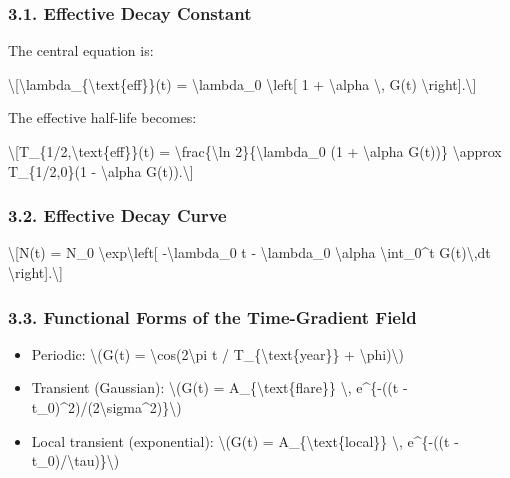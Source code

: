 \documentclass[
  10pt,
]{article}
\providecommand{\tightlist}{%
  \setlength{\itemsep}{0pt}\setlength{\parskip}{0pt}}
\begin{document}
\hypertarget{effective-decay-constant}{%
\subsubsection{3.1. Effective Decay
Constant}\label{effective-decay-constant}}

The central equation is:

\textbackslash{[}\textbackslash lambda\_\{\textbackslash text\{eff\}\}(t)
= \textbackslash lambda\_0 \textbackslash left{[} 1 +
\textbackslash alpha \textbackslash, G(t)
\textbackslash right{]}.\textbackslash{]}

The effective half-life becomes:

\textbackslash{[}T\_\{1/2,\textbackslash text\{eff\}\}(t) =
\textbackslash frac\{\textbackslash ln 2\}\{\textbackslash lambda\_0 (1
+ \textbackslash alpha G(t))\} \textbackslash approx T\_\{1/2,0\}(1 -
\textbackslash alpha G(t)).\textbackslash{]}

\hypertarget{effective-decay-curve}{%
\subsubsection{3.2. Effective Decay Curve}\label{effective-decay-curve}}

\textbackslash{[}N(t) = N\_0 \textbackslash exp\textbackslash left{[}
-\textbackslash lambda\_0 t - \textbackslash lambda\_0
\textbackslash alpha \textbackslash int\_0\^{}t
G(t\textquotesingle)\textbackslash,dt\textquotesingle{}
\textbackslash right{]}.\textbackslash{]}

\hypertarget{functional-forms-of-the-time-gradient-field}{%
\subsubsection{3.3. Functional Forms of the Time-Gradient
Field}\label{functional-forms-of-the-time-gradient-field}}

\begin{itemize}
\tightlist
\item
  Periodic: \textbackslash(G(t) = \textbackslash cos(2\textbackslash pi
  t / T\_\{\textbackslash text\{year\}\} +
  \textbackslash phi)\textbackslash)
\item
  Transient (Gaussian): \textbackslash(G(t) =
  A\_\{\textbackslash text\{flare\}\} \textbackslash, e\^{}\{-((t -
  t\_0)\^{}2)/(2\textbackslash sigma\^{}2)\}\textbackslash)
\item
  Local transient (exponential): \textbackslash(G(t) =
  A\_\{\textbackslash text\{local\}\} \textbackslash, e\^{}\{-((t -
  t\_0)/\textbackslash tau)\}\textbackslash)
\end{itemize}
\end{document}
